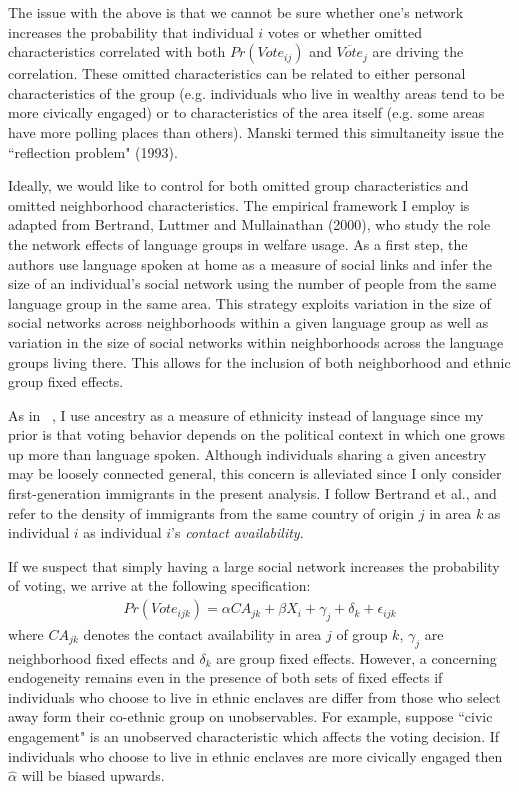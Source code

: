 \documentclass[11pt, oneside]{article}   	%
\newcommand{\eqs}[1]{\begin{align*}#1\end{align*}}
\begin{document}
The issue with the above is that we cannot be sure whether one's network increases the probability that individual $i$ votes or whether omitted characteristics correlated with both $Pr(Vote_{ij})$ and $\overline{Vote}_j$ are driving the correlation. These omitted characteristics can be related to either personal characteristics of the group (e.g. individuals who live in wealthy areas tend to be more civically engaged) or to characteristics of the area itself (e.g. some areas have more polling places than others). Manski termed this simultaneity issue the ``reflection problem" (1993).

Ideally, we would like to control for both omitted group characteristics and omitted neighborhood characteristics. The empirical framework I employ is adapted from Bertrand, Luttmer and Mullainathan (2000), who study the role the network effects of language groups in welfare usage. As a first step, the authors use language spoken at home as a measure of social links and infer the size of an individual's social network using the number of people from the same language group in the same area. This strategy exploits variation in the size of social networks across neighborhoods within a given language group as well as variation in the size of social networks within neighborhoods across the language groups living there. This allows for the inclusion of both neighborhood and ethnic group fixed effects.

As in ~\cite{Borjas1992}, I use ancestry as a measure of ethnicity instead of language since my prior is that voting behavior depends on the political context in which one grows up more than language spoken. Although individuals sharing a given ancestry may be loosely connected general, this concern is alleviated since I only consider first-generation immigrants in the present analysis. I follow Bertrand et al., and refer to the density of immigrants from the same country of origin $j$ in area $k$ as individual $i$ as individual $i$'s \emph{contact availability}. 

If we suspect that simply having a large social network increases the probability of voting, we arrive at the following specification:
\eqs{
	Pr(Vote_{ijk}) = \alpha CA_{jk} + \beta X_i + \gamma_j +\delta_k + \epsilon_{ijk}
}
where $CA_{jk}$ denotes the contact availability in area $j$ of group $k$, $\gamma_j$ are neighborhood fixed effects and $\delta_k$ are group fixed effects. However, a concerning endogeneity remains even in the presence of both sets of fixed effects if individuals who choose to live in ethnic enclaves are differ from those who select away form their co-ethnic group on unobservables. For example, suppose ``civic engagement" is an unobserved characteristic which affects the voting decision. If individuals who choose to live in ethnic enclaves are more civically engaged then $\hat\alpha$ will be biased upwards.
\end{document}

